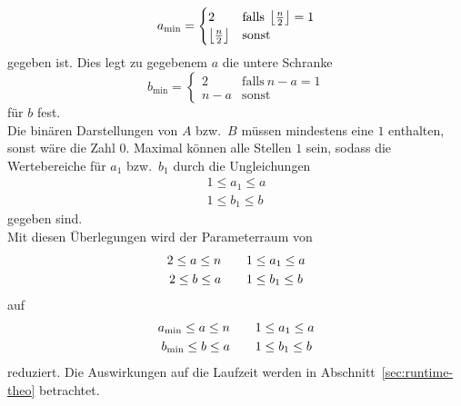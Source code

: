 \begin{equation}
		a_\mathrm{min}=\begin{cases}
						2 & \mathrm{falls}\:\left\lfloor\frac{n}{2}\right\rfloor = 1 \\
						\left\lfloor\frac{n}{2}\right\rfloor & \mathrm{sonst}
		\end{cases}\label{eq:amin}
\end{equation}
gegeben ist. Dies legt zu gegebenem $a$ die untere Schranke
\begin{equation}
		b_\mathrm{min}=\begin{cases}
						2 & \mathrm{falls}\:n-a=1 \\
						n-a & \mathrm{sonst}
		\end{cases}\label{eq:amax}
\end{equation}
für $b$ fest.\\
Die binären Darstellungen von $A$ bzw.\ $B$ müssen mindestens eine $1$ enthalten, sonst wäre die Zahl $0$. Maximal können alle Stellen $1$ sein, sodass die Wertebereiche für $a_1$ bzw.\ $b_1$ durch die Ungleichungen
\begin{align*}
		1\leq a_1\leq a \\
		1\leq b_1\leq b
\end{align*}
gegeben sind.\\
Mit diesen Überlegungen wird der Parameterraum von
\begin{align}
		2 \leq a \leq n &\quad\quad 1 \leq a_1 \leq a \notag \\
		2 \leq b \leq a &\quad\quad	1 \leq b_1 \leq b \label{eq:parameterspace1}
\end{align}
auf
\begin{align}
		a_\mathrm{min} \leq a \leq n &\quad\quad	1 \leq a_1 \leq a \notag \\
		b_\mathrm{min} \leq b \leq a &\quad\quad	1 \leq b_1 \leq b \label{eq:parameterspace2}
\end{align}
reduziert. Die Auswirkungen auf die Laufzeit werden in Abschnitt~\ref{sec:runtime-theo} betrachtet.


